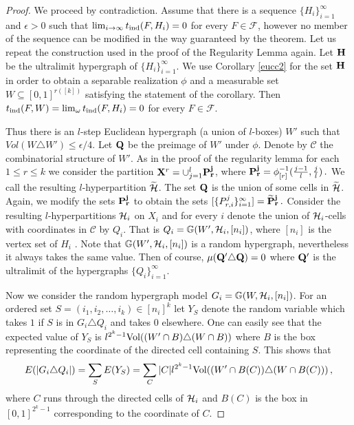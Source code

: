 \documentclass [11pt] {article}
\def\e{\epsilon}
\def\limo{\lim_{\omega}}
\def\bH{{\bf H}}
\def\cH{\mbox{$\cal H$}}
\def\to{\rightarrow}
\def\xo{{\bf X}}
\def\wp{\widetilde{P}}
\begin{document}
\begin{proof} We proceed by contradiction. 
Assume that there is a sequence $\{H_i\}_{i=1}^\infty$ and $\e >0$ 
such that $\lim_{i\to\infty}t_{\rm ind}(F,H_i)=0$ for every $F\in\mathcal{F}$,
however no member of the sequence can be modified in the way guaranteed by 
the theorem. Let us repeat the construction used in the proof
of the Regularity Lemma again. 
Let $\bH$ be the ultralimit hypergraph of
$\{H_i\}^\infty_{i=1}$. We use Corollary \ref{eucc2} 
for the set $\bH$ in order to
obtain a separable realization $\phi$ and a measurable set $W\subseteq
[0,1]^{r([k])}$ satisfying the statement of the corollary. 
Then $t_{\rm ind}(F,W)=\limo t_{\rm ind}(F,H_i)=0$ 
for every $F\in\mathcal{F}$.

\noindent
Thus there is an $l$-step Euclidean hypergraph (a union of $l$-boxes)
$W'$ such that $Vol(W\triangle W')\leq\e/4$. Let ${\bf Q}$ be the preimage 
of $W'$ under $\phi$. Denote by $\mathcal{C}$ the combinatorial structure
of $W'$.
As in the proof of the regularity lemma 
for each $1\leq r \leq k$ we consider
the partition $\xo^r=\cup_{j=1}^l{\bf  P^j_r}$, where ${\bf P^j_r}=
\phi^{-1}_{[r]}(\frac{j-1}{l}, \frac{j}{l})\,.$ We call the resulting
$l$-hyperpartition $\widetilde{\cH}$. The set ${\bf Q}$ is the union of some
cells in $\widetilde{\cH}$. Again,  we modify the sets ${\bf P^j_r}$
to obtain the sets $[\{P^j_{r,i}\}^\infty_{i=1}]={\bf \wp^j_r}\,.$
Consider the resulting $l$-hyperpartitions $\cH_i$ on $X_i$ and for every 
$i$ denote 
the union of $\cH_i$-cells with coordinates in $\mathcal{C}$ by $Q_i$.
That is 
$Q_i=\mathbb{G}(W',\cH_i,[n_i])$, where $[n_i]$ is the vertex set of $H_i$ .
Note that $\mathbb{G}(W',\cH_i,[n_i])$
 is a random hypergraph, nevertheless it
always takes the same value.
Then of course, $\mu({\bf Q'\triangle Q})=0$
where ${\bf Q'}$ is the ultralimit of the hypergraphs $\{Q_i\}^\infty_{i=1}$.

\noindent
Now we consider the random hypergraph model $G_i=\mathbb{G}(W,\cH_i,[n_i])$.
For an ordered set $S=(i_1,i_2,\dots,i_k)\in [n_i]^k$ let $Y_S$ denote the
random variable which takes $1$ if $S$ is in 
$G_i\triangle Q_i$ and takes $0$ elsewhere.
One can easily see that the expected value of
$Y_S$ is $l^{2^k-1}{\rm Vol}((W'\cap B)\triangle(W\cap B))$ 
where $B$ is the box representing the coordinate of the directed cell 
containing $S$.
This shows that
 $$E(|G_i\triangle Q_i|)=\sum_S E(Y_S)=\sum_C 
|C|l^{2^k-1}{\rm Vol}((W'\cap B(C))
\triangle (W\cap B(C)))\,,$$ where $C$ runs through the directed 
cells of $\cH_i$ and $B(C)$ is the box in $[0,1]^{2^k-1}$ corresponding to the
coordinate of $C$.


\end{proof}
\end{document}
